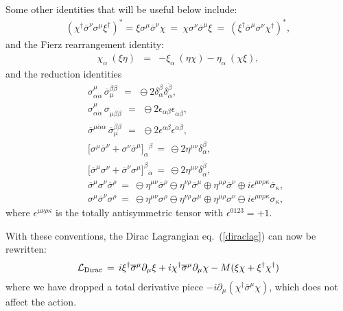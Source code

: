 \documentclass[12pt]{article}
\def\BDpos{}
\def\BDplus{+}
\def\BDminus{-}
\def\BDpos{-}
\def\BDplus{-}
\def\BDminus{+}
\def\BDpos{\oplus}
\def\BDplus{\oplus}
\def\BDminus{\ominus}
\def\BDpos{\ominus}
\def\BDplus{\ominus}
\def\BDminus{\oplus}
\def\beq{\begin{eqnarray}}
\def\eeq{\end{eqnarray}}
\def\lagr{{\cal L}}
\def\sigmabar{\overline\sigma}
\begin{document}
Some other identities that will be useful below include:
\beq
(\chi^\dagger \sigmabar^\nu \sigma^\mu \xi^\dagger)^* =
\xi\sigma^\mu \sigmabar^\nu \chi  \>=\>
\chi \sigma^\nu \sigmabar^\mu \xi \>=\>
(\xi^\dagger \sigmabar^\mu \sigma^\nu \chi^\dagger)^*,
\label{eq:dei}
\eeq
and the Fierz rearrangement identity:
\beq
\chi_{\alpha}\> (\xi\eta) &=&
- \xi_{\alpha}\> (\eta\chi) - \eta_\alpha\> (\chi\xi) ,
\label{fierce}
\eeq
and the reduction identities
\beq
&&
\sigma_{\alpha\dot{\alpha}}^\mu \,
\sigmabar_\mu^{\dot{\beta}\beta} 
\,\>=\>\, 
\BDpos 2 \delta_\alpha^\beta
\delta_{\dot{\alpha}}^{\dot{\beta}} ,
\label{eq:feif}
\\
&&
\sigma_{\alpha\dot{\alpha}}^\mu \,
\sigma_{\mu\beta\dot{\beta}} 
\,\>=\>\, 
\BDpos 2 \epsilon_{\alpha\beta}
\epsilon_{\dot{\alpha}\dot{\beta}} ,
\label{eq:rickettsisok}
\\
&&
\sigmabar^{\mu\dot\alpha\alpha} \,
\sigmabar_\mu^{\dot\beta\beta} 
\,\>=\>\, 
\BDpos 2 \epsilon^{\alpha\beta}
\epsilon^{\dot{\alpha}\dot{\beta}} ,
\label{eq:pagehousesux}
\\
&&
\bigl[ \sigma^\mu \sigmabar^\nu + \sigma^\nu \sigmabar^\mu
\bigr ]_\alpha{}^\beta  
\,=\,
\BDpos 2 \eta^{\mu\nu} \delta_\alpha^\beta 
,
\label{pauliidentA}
\\
&&
\bigl[ \sigmabar^\mu \sigma^\nu + \sigmabar^\nu \sigma^\mu \bigr
]^{\dot{\beta}}{}_{\dot{\alpha}}
\,=\,
\BDpos 2 \eta^{\mu\nu} \delta_{\dot{\alpha}}^{\dot{\beta}} ,
\label{pauliidentB}
\\
&&\sigmabar^\mu \sigma^\nu \sigmabar^\rho \>=\>
\BDpos \eta^{\mu\nu} \sigmabar^\rho 
\BDplus \eta^{\nu\rho} \sigmabar^\mu 
\BDminus \eta^{\mu\rho} \sigmabar^\nu 
\BDminus i \epsilon^{\mu\nu\rho\kappa} \sigmabar_\kappa ,
\label{eq:lloydhouserules}
\\
&&\sigma^\mu \sigmabar^\nu \sigma^\rho \>=\>
\BDpos \eta^{\mu\nu} \sigma^\rho 
\BDplus \eta^{\nu\rho} \sigma^\mu 
\BDminus \eta^{\mu\rho} \sigma^\nu 
\BDplus i \epsilon^{\mu\nu\rho\kappa} \sigma_\kappa ,
\label{eq:pagehouseisOK}
\eeq
where $\epsilon^{\mu\nu\rho\kappa}$ is the totally antisymmetric tensor
with $\epsilon^{0123}=+1$. 

With these conventions, the Dirac Lagrangian eq.~(\ref{diraclag}) can now
be rewritten: 
\beq
\lagr_{\rm Dirac}
\, = \,  i \xi^\dagger \sigmabar^\mu \partial_\mu \xi 
       + i \chi^\dagger \sigmabar^\mu \partial_\mu \chi 
       - M (\xi\chi + \xi^\dagger \chi^\dagger)
\eeq
where we have dropped a total derivative piece 
$-i\partial_\mu(\chi^\dagger \sigmabar^\mu \chi)$, 
which does not affect the action. 
\end{document}
